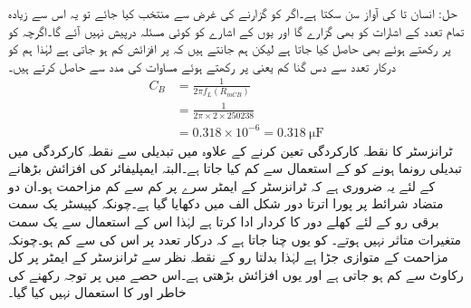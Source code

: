 حل: انسان  تا  کی آواز سن سکتا ہے۔اگر  کو   گزارنے کی غرض سے منتخب کیا جائے تو یہ اس سے زیادہ تمام تعدد کے اشارات کو بھی گزارے گا اور یوں  کے اشارے کو کوئی مسئلہ درپیش نہیں آئے گا۔اگرچہ   کو   پر رکھتے ہوئے بھی  حاصل کیا جاتا ہے لیکن ہم جانتے ہیں کہ  پر افزائش کم ہو جاتی ہے لہٰذا ہم   کو درکار تعدد سے دس گنا کم یعنی   پر رکھتے ہوئے مساوات   کی مدد سے  حاصل کرتے ہیں۔
\begin{align*}
C_B&=\frac{1}{2 \pi f_L \left(R_{mCB} \right ) }\\
&=\frac{1}{2 \pi \times 2 \times 250238 }\\
&=0.318 \times 10^{-6}= \SI{0.318}{\micro \farad}
\end{align*}
ٹرانزسٹر کا نقطہ کارکردگی تعین کرنے کے علاوہ   میں تبدیلی سے  نقطہ کارکردگی میں تبدیلی رونما ہونے کو  کے استعمال سے کم کیا جاتا ہے۔البتہ ایمپلیفائر کی افزائش بڑھانے کے  لئے یہ ضروری ہے کہ ٹرانزسٹر کے ایمٹر سرے پر کم سے کم مزاحمت ہو۔ان دو متضاد شرائط پر پورا اترتا دور شکل  الف میں دکھایا گیا ہے۔چونکہ کپیسٹر  یک سمت برقی رو کے لئے کھلے دور کا کردار ادا کرتا ہے لہٰذا اس کے استعمال سے یک سمت متغیرات متاثر نہیں ہوتے۔ کو یوں چنا جاتا ہے کہ درکار تعدد پر اس کی   سے کم ہو۔چونکہ  مزاحمت  کے متوازی جڑا ہے لہٰذا بدلتا رو کے نقطہ نظر سے ٹرانزسٹر کے ایمٹر پر کل رکاوٹ  سے کم ہو جاتی ہے اور یوں افزائش بڑھتی ہے۔اس حصے میں  پر توجہ رکھنے کی خاطر  اور  کا استعمال نہیں کیا گیا۔

